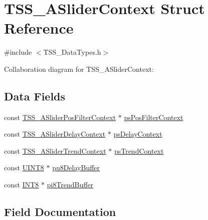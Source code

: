 \hypertarget{struct_t_s_s___a_slider_context}{}\section{T\+S\+S\+\_\+\+A\+Slider\+Context Struct Reference}
\label{struct_t_s_s___a_slider_context}


{\ttfamily \#include $<$T\+S\+S\+\_\+\+Data\+Types.\+h$>$}



Collaboration diagram for T\+S\+S\+\_\+\+A\+Slider\+Context\+:
\subsection*{Data Fields}
\begin{DoxyCompactItemize}
\item 
const \hyperlink{struct_t_s_s___a_slider_pos_filter_context}{T\+S\+S\+\_\+\+A\+Slider\+Pos\+Filter\+Context} $\ast$ \hyperlink{struct_t_s_s___a_slider_context_a9d95363ce80d53c8683c4ea44c804714}{ps\+Pos\+Filter\+Context}
\item 
const \hyperlink{struct_t_s_s___a_slider_delay_context}{T\+S\+S\+\_\+\+A\+Slider\+Delay\+Context} $\ast$ \hyperlink{struct_t_s_s___a_slider_context_aa125fd0915d49efa0fe3999edfbeb3dc}{ps\+Delay\+Context}
\item 
const \hyperlink{struct_t_s_s___a_slider_trend_context}{T\+S\+S\+\_\+\+A\+Slider\+Trend\+Context} $\ast$ \hyperlink{struct_t_s_s___a_slider_context_abe099a6d454c092a0d6bb41acd35cb40}{ps\+Trend\+Context}
\item 
const \hyperlink{_t_s_s___data_types_8h_ab27e9918b538ce9d8ca692479b375b6a}{U\+I\+N\+T8} $\ast$ \hyperlink{struct_t_s_s___a_slider_context_a12a93ed2a418cbb140aa8306641509ae}{pu8\+Delay\+Buffer}
\item 
const \hyperlink{_t_s_s___data_types_8h_a7ebe70ceca856797319175e30bcf003d}{I\+N\+T8} $\ast$ \hyperlink{struct_t_s_s___a_slider_context_ae0b5de723b73bf3761e0e7f0da7e8564}{pi8\+Trend\+Buffer}
\end{DoxyCompactItemize}


\subsection{Field Documentation}
\mbox{\label{struct_t_s_s___a_slider_context_ae0b5de723b73bf3761e0e7f0da7e8564}} 
